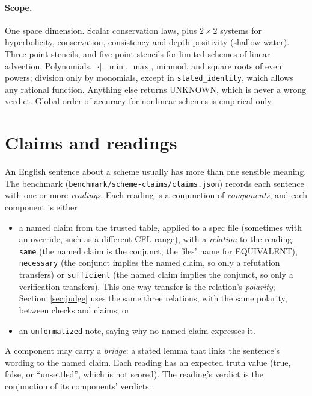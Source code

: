 \documentclass[11pt,a4paper]{article}
\newcommand{\code}[1]{\texttt{#1}}
\newcommand{\U}{\textsf{UNKNOWN}}
\newcommand{\EQV}{\textsf{EQUIVALENT}}
\begin{document}
\paragraph{Scope.} One space dimension. Scalar conservation laws, plus $2\times2$ systems for
hyperbolicity, conservation, consistency and depth positivity (shallow water). Three-point stencils,
and five-point stencils for limited schemes of linear advection. Polynomials, $|\cdot|$, $\min$,
$\max$, $\mathrm{minmod}$, and square roots of even powers; division only by monomials, except in
\code{stated\_identity}, which allows any rational function. Anything else
returns \U, which is never a wrong verdict. Global order of accuracy for nonlinear schemes is
empirical only.

\section{Claims and readings}\label{sec:readings}

An English sentence about a scheme usually has more than one sensible meaning. The benchmark
(\code{benchmark/scheme-claims/claims.json}) records each sentence with one or more \emph{readings}.
Each reading is a conjunction of \emph{components}, and each component is either
\begin{itemize}
\item a named claim from the trusted table, applied to a spec file (sometimes with an override, such as
  a different CFL range), with a \emph{relation} to the reading: \code{same} (the named claim is the
  conjunct; the files' name for \EQV), \code{necessary} (the conjunct implies the named claim, so only a
  refutation transfers) or \code{sufficient} (the named claim implies the conjunct, so only a verification
  transfers). This one-way transfer is the relation's \emph{polarity}; Section~\ref{sec:judge} uses the
  same three relations, with the same polarity, between checks and claims; or
\item an \code{unformalized} note, saying why no named claim expresses it.
\end{itemize}
A component may carry a \emph{bridge}: a stated lemma that links the sentence's wording to the named
claim. Each reading has an expected truth value (true, false, or ``unsettled'', which is not scored).
The reading's verdict is the conjunction of its components' verdicts.
\end{document}
